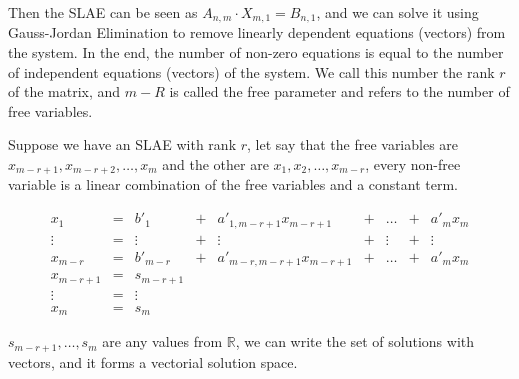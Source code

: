     Then the SLAE can be seen as $A_{n,m} \cdot X_{m,1} = B_{n,1}$, and we can solve it using Gauss-Jordan Elimination to remove linearly dependent equations (vectors) from the system. In the end, the number of non-zero equations is equal to the number of independent equations (vectors) of the system. We call this number the rank $r$ of the matrix, and $m-R$ is called the free parameter and refers to the number of free variables.

    Suppose we have an SLAE with rank $r$, let say that the free variables
    are $x_{m-r+1},x_{m-r+2},\dots,x_{m}$ and the other are $x_1,x_2,\dots,x_{m-r}$, every non-free variable is a linear combination of the free variables and a constant term.

    \[
    \begin{matrix}
        x_1 &=&  b'_1  &+& a'_{1,m-r+1}x_{m-r+1} &+& \dots &+& a'_{m}x_m \\
     \vdots &=& \vdots&+& \vdots &+& \vdots &+& \vdots \\
     x_{m-r}&=& b'_{m-r}&+& a'_{m-r,m-r+1}x_{m-r+1} &+& \dots &+& a'_mx_m \\
     x_{m-r+1} &=& s_{m-r+1} \\
     \vdots &=& \vdots \\
     x_m &=& s_m
    \end{matrix}
    \]

    $s_{m-r+1},\dots,s_m$ are any values from $\mathbb{R}$, we can write the set of solutions with vectors, and it forms a vectorial solution space.

